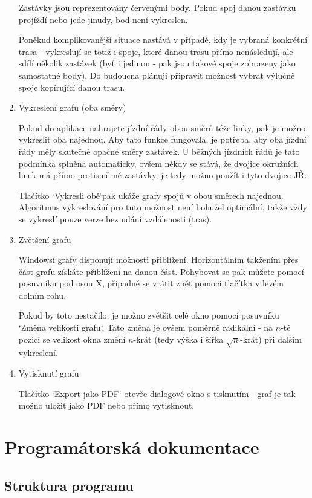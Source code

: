\documentclass[14pt]{article}
\begin{document}
\begin{enumerate}
Zastávky jsou reprezentovány červenými body. Pokud spoj danou zastávku projíždí nebo jede jinudy, bod není vykreslen.

 Poněkud komplikovanější situace nastává v případě, kdy je vybraná konkrétní trasa - vykreslují se totiž i spoje, které danou trasu přímo nenásledují, ale sdílí několik zastávek (byť i jedinou - pak jsou takové spoje zobrazeny jako samostatné body). Do budoucna plánuji připravit možnost vybrat výlučně spoje kopírující danou trasu.

\item Vykreslení grafu (oba směry)

Pokud do aplikace nahrajete jízdní řády obou směrů téže linky, pak je možno vykreslit oba najednou. Aby tato funkce fungovala, je potřeba, aby oba jízdní řády měly skutečně opačné směry zastávek. U běžných jízdních řádů je tato podmínka splněna automaticky, ovšem někdy se stává, že dvojice okružních linek má přímo protisměrné zastávky, je tedy možno použít i tyto dvojice JŘ.

Tlačítko `Vykresli obě`pak ukáže grafy spojů v obou směrech najednou. Algoritmus vykreslování pro tuto možnost není bohužel optimální, takže vždy se vykreslí pouze verze bez udání vzdálenosti (tras).

\item Zvětšení grafu

Windowsí grafy disponují možnosti přiblížení. Horizontálním takžením přes část grafu získáte přiblížení na danou část. Pohybovat se pak můžete pomocí posuvníku pod osou X, případně se vrátit zpět pomocí tlačítka v levém dolním rohu.

Pokud by toto nestačilo, je možno zvětšit celé okno pomocí posuvníku `Změna velikosti grafu`. Tato změna je ovšem poměrně radikální - na $n$-té pozici se velikost okna změní $n$-krát (tedy výška i šířka $\sqrt{n}$-krát) při dalším vykreslení.

\item Vytisknutí grafu

Tlačítko `Export jako PDF` otevře dialogové okno s tisknutím - graf je tak možno uložit jako PDF nebo přímo vytisknout.
\end{enumerate}

\section{Programátorská dokumentace}

\subsection{Struktura programu}
\end{document}

